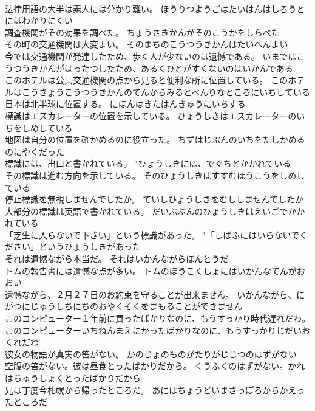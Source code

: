 \documentclass[8pt]{extreport}
\begin{document}
\begin{CJK}{UTF8}{min}
\\	法律用語の大半は素人には分かり難い。	ほうりつようごはたいはんはしろうとにはわかりにくい 
\\	調査機関がその効果を調べた。	ちょうさきかんがそのこうかをしらべた 
\\	その町の交通機関は大変よい。	そのまちのこうつうきかんはたいへんよい 
\\	今では交通機関が発達したため、歩く人が少ないのは遺憾である。	いまではこうつうきかんがはったつしたため、あるくひとがすくないのはいかんである 
\\	このホテルは公共交通機関の点から見ると便利な所に位置している。	このホテルはこうきょうこうつうきかんのてんからみるとべんりなところにいちしている 
\\	日本は北半球に位置する。	にほんはきたはんきゅうにいちする 
\\	標識はエスカレーターの位置を示している。	ひょうしきはエスカレーターのいちをしめしている 
\\	地図は自分の位置を確かめるのに役立った。	ちずはじぶんのいちをたしかめるのにやくだった 
\\	標識には、出口と書かれている。	"ひょうしきには、でぐちとかかれている 
\\	その標識は進む方向を示している。	そのひょうしきはすすむほうこうをしめしている 
\\	停止標識を無視しませんでしたか。	ていしひょうしきをむししませんでしたか 
\\	大部分の標識は英語で書かれている。	だいぶぶんのひょうしきはえいごでかかれている 
\\	「芝生に入らないで下さい」という標識があった。	"「しばふにはいらないでください」というひょうしきがあった 
\\	それは遺憾ながら本当だ。	それはいかんながらほんとうだ 
\\	トムの報告書には遺憾な点が多い。	トムのほうこくしょにはいかんなてんがおおい 
\\	遺憾ながら、２月２７日のお約束を守ることが出来ません。	いかんながら、にがつにじゅうしちにちのおやくそくをまもることができません 
\\	このコンピューター１年前に買ったばかりなのに、もうすっかり時代遅れだわ。	このコンピューターいちねんまえにかったばかりなのに、もうすっかりじだいおくれだわ 
\\	彼女の物語が真実の筈がない。	かのじょのものがたりがじじつのはずがない 
\\	空腹の筈がない。彼は昼食とったばかりだから。	くうふくのはずがない。かれはちゅうしょくとったばかりだから 
\\	兄は丁度今札幌から帰ったところだ。	あにはちょうどいまさっぽろからかえったところだ 

\end{CJK}
\end{document}
